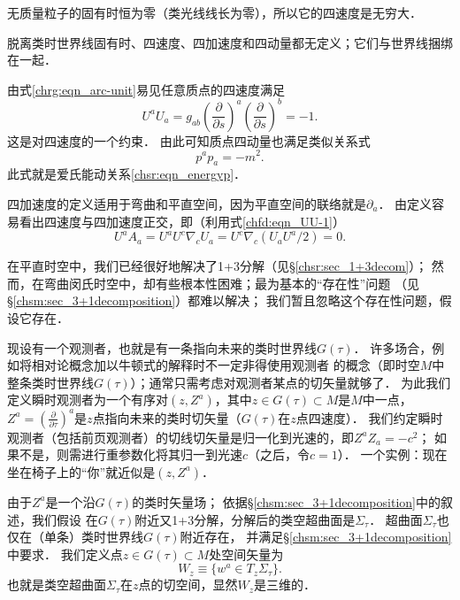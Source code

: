 无质量粒子的固有时恒为零（类光线线长为零），所以它的四速度是无穷大．

脱离类时世界线固有时、四速度、四加速度和四动量都无定义；它们与世界线捆绑在一起．

由式\eqref{chrg:eqn_arc-unit}易见任意质点的四速度满足
\begin{equation}\label{chfd:eqn_UU-1}
    U^a U_a =g_{ab}\left(\frac{\partial}{\partial s}\right)^a
      \left(\frac{\partial}{\partial s}\right)^b=-1 .
\end{equation}
这是对四速度的一个约束．
由此可知质点四动量也满足类似关系式
\begin{equation}
    p^a p_a = - m^2 .
\end{equation}
此式就是爱氏能动关系\eqref{chsr:eqn_energyp}．

四加速度的定义适用于弯曲和平直空间，因为平直空间的联络就是$\partial_a$．
由定义容易看出四速度与四加速度正交，即（利用式\eqref{chfd:eqn_UU-1}）
\begin{equation}\label{chfd:eqn_UA=0}
    U^a A_a =U^a U^c \nabla_c U_a = U^c \nabla_c (U_a U^a/2) = 0.
\end{equation}



在平直时空中，我们已经很好地解决了1+3分解（见\S\ref{chsr:sec_1+3decom}）；
然而，在弯曲闵氏时空中，却有些根本性困难；最为基本的“存在性”问题
（见\S\ref{chsm:sec_3+1decomposition}）都难以解决；
我们暂且忽略这个存在性问题，假设它存在．

现设有一个观测者，也就是有一条指向未来的类时世界线$G(\tau)$．
许多场合，例如将相对论概念加以{\kaishu 牛顿}式的解释时不一定非得使用观测者
的概念（即时空$M$中整条类时世界线$G(\tau)$）；通常只需考虑对观测者某点的切矢量就够了．
为此我们定义{\heiti 瞬时观测者}为一个有序对$(z,Z^a)$，其中$z\in G(\tau)\subset M$是$M$中一点，
$Z^a=(\frac{\partial}{\partial \tau})^a$是$z$点指向未来的类时切矢量（$G(\tau)$在$z$点四速度）．
我们约定瞬时观测者（包括前页观测者）的切线切矢量是归一化到光速的，即$Z^aZ_a=-c^2$；
如果不是，则需进行重参数化将其归一到光速$c$（之后，令$c=1$）．
一个实例：现在坐在椅子上的“你”就近似是$(z,Z^a)$．

由于$Z^a$是一个沿$G(\tau)$的类时矢量场；
依据\S\ref{chsm:sec_3+1decomposition}中的叙述，我们假设
在$G(\tau)$附近又1+3分解，分解后的类空超曲面是$\Sigma_\tau$．
超曲面$\Sigma_\tau$也仅在（单条）类时世界线$G(\tau)$附近存在，
并满足\S\ref{chsm:sec_3+1decomposition}中要求．
我们定义点$z\in G(\tau)\subset M$处{\heiti 空间矢量}为
\begin{equation}\label{chfd:eqn_space-vector}
    W_z\equiv \bigl\{ w^a \in T_z\Sigma_\tau \bigr\} .
\end{equation}
也就是类空超曲面$\Sigma_\tau$在$z$点的切空间，显然$W_z$是三维的．


